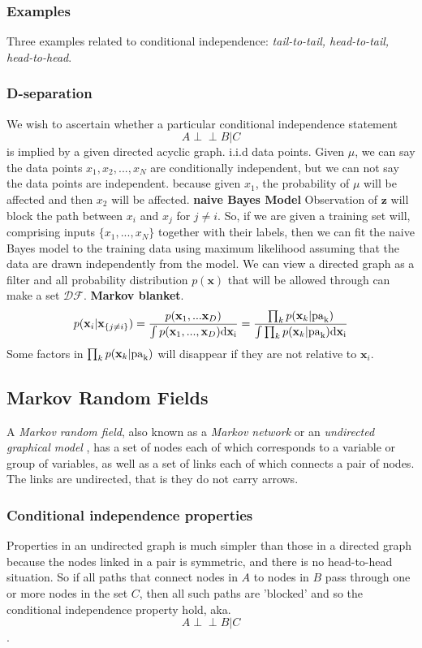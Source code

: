 \documentclass[a4paper]{book}
\def\ci{\perp\!\!\!\perp}
\renewcommand{\bf}{\mathbf}
\begin{document}
\subsubsection{Examples}
Three examples related to conditional independence: \textit{tail-to-tail, head-to-tail, head-to-head}.
\subsubsection{D-separation}
We wish to ascertain whether a particular conditional
independence statement$$A\ci B |C$$is implied by a given directed acyclic graph.
\newline
i.i.d data points. Given $\mu$, we can say the data points $x_1,x_2,...,x_N$ are conditionally independent, but we can not say the data points are independent. because given $x_1$, the probability of $\mu$ will be affected and then $x_2$ will be affected.
\newline
\textbf{naive Bayes Model} Observation of $\bf{z}$ will block the path between $x_i$ and $x_j$ for $j\neq i$. So, if we are given a training set will, comprising inputs $\{x_1,...,x_N\}$ together with their labels, then we can fit the naive Bayes model to the training data using maximum likelihood assuming that the data are drawn independently from the model.
\newline
We can view a directed graph as a filter and all probability distribution $p(\bf x)$ that will be allowed through can make a set $\mathcal {DF}$.
\newline
\textbf{Markov blanket}.
\begin{equation}\label{eq8.9}
  p(\bf{x}_i|\bf{x}_{\{j\neq i\}}) = \frac{p(\bf x_1,...\bf x_D)}{\int p(\bf x_1,...,\bf x_D)\rm d\bf x_i}=\frac{\prod_k p(\bf x_k|\rm{pa}_k)}{\int \prod_k p(\bf x_k|\rm{pa}_k)\rm{d}\bf x_i}
\end{equation}
Some factors in $\prod_k p(\bf x_k|\rm{pa}_k)$ will disappear if they are not relative to $\bf x_i$.
\subsection{Markov Random Fields}
A \emph{Markov random field}, also known as a \emph{Markov network} or an \emph{undirected graphical model} , has a set of nodes each of which corresponds to a variable or group of variables, as well as a set of links each of which connects a pair of nodes. The links are undirected, that is they do not carry arrows.
\subsubsection{Conditional independence properties}
Properties in an undirected graph is much simpler than those in a directed graph because the nodes linked in a pair is symmetric, and there is no head-to-head situation. So if all paths that connect nodes in $A$ to nodes in $B$ pass through one or more nodes in the set $C$, then all such paths are 'blocked' and so the conditional independence property hold, aka. $$A\ci B|C$$.
\end{document}
